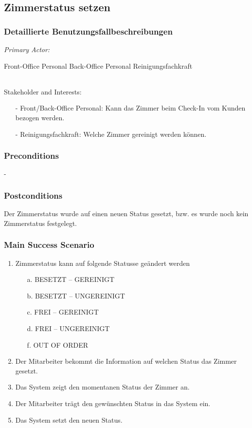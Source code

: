 \documentclass[./detailed_overview_usecases.tex]{subfiles}
\begin{document}
    \subsection{Zimmerstatus setzen}
    \subsubsection{Detaillierte Benutzungsfallbeschreibungen}
    \textit{Primary Actor:}
    \begin{enumerate}
        Front-Office Personal
        Back-Office Personal
        Reinigungsfachkraft
    \end{enumerate}
    \\
    Stakeholder and Interests:
    \begin{itemize}
        \item[-] Front/Back-Office Personal: Kann das Zimmer beim Check-In vom Kunden bezogen werden.
        \item[-] Reinigungsfachkraft: Welche Zimmer gereinigt werden können.
    \end{itemize}

    \subsubsection*{Preconditions}
    -
    \subsubsection*{Postconditions}
    Der Zimmerstatus wurde auf einen neuen Status gesetzt, bzw. es wurde noch kein Zimmerstatus festgelegt.

    \subsubsection*{Main Success Scenario}
    \begin{enumerate}
        \item Zimmerstatus kann auf folgende Statusse geändert werden
        \begin{itemize}
            \item[a.] BESETZT – GEREINIGT
            \item[b.] BESETZT – UNGEREINIGT
            \item[c.] FREI – GEREINIGT
            \item[d.] FREI – UNGEREINIGT
            \item[f.] OUT OF ORDER
        \end{itemize}
        \item Der Mitarbeiter bekommt die Information auf welchen Status das Zimmer gesetzt.
        \item Das System zeigt den momentanen Status der Zimmer an.
        \item Der Mitarbeiter trägt den gewünschten Status in das System ein.
        \item Das System setzt den neuen Status.
    \end{enumerate}
\end{document}

